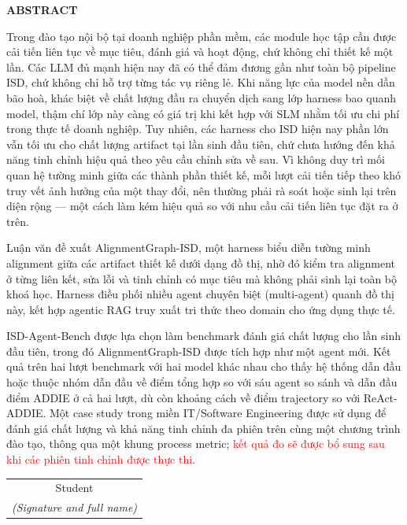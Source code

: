 \documentclass[../main.tex]{subfiles}
\begin{document}
\begin{center}
    \Large{\textbf{ABSTRACT}}\\
\end{center}
\vspace{1cm}
Trong đào tạo nội bộ tại doanh nghiệp phần mềm, các module học tập cần được cải tiến liên tục về mục tiêu, đánh giá và hoạt động, chứ không chỉ thiết kế một lần. Các \gls{LLM} đủ mạnh hiện nay đã có thể đảm đương gần như toàn bộ pipeline \gls{ISD}, chứ không chỉ hỗ trợ từng tác vụ riêng lẻ. Khi năng lực của model nền dần bão hoà, khác biệt về chất lượng đầu ra chuyển dịch sang lớp harness bao quanh model, thậm chí lớp này càng có giá trị khi kết hợp với \gls{SLM} nhằm tối ưu chi phí trong thực tế doanh nghiệp. Tuy nhiên, các harness cho ISD hiện nay phần lớn vẫn tối ưu cho chất lượng artifact tại lần sinh đầu tiên, chứ chưa hướng đến khả năng tinh chỉnh hiệu quả theo yêu cầu chỉnh sửa về sau. Vì không duy trì mối quan hệ tường minh giữa các thành phần thiết kế, mỗi lượt cải tiến tiếp theo khó truy vết ảnh hưởng của một thay đổi, nên thường phải rà soát hoặc sinh lại trên diện rộng — một cách làm kém hiệu quả so với nhu cầu cải tiến liên tục đặt ra ở trên.

Luận văn đề xuất AlignmentGraph-ISD, một harness biểu diễn tường minh alignment giữa các artifact thiết kế dưới dạng đồ thị, nhờ đó kiểm tra alignment ở từng liên kết, sửa lỗi và tinh chỉnh có mục tiêu mà không phải sinh lại toàn bộ khoá học. Harness điều phối nhiều agent chuyên biệt (multi-agent) quanh đồ thị này, kết hợp agentic RAG truy xuất tri thức theo domain cho ứng dụng thực tế.

ISD-Agent-Bench được lựa chọn làm benchmark đánh giá chất lượng cho lần sinh đầu tiên, trong đó AlignmentGraph-ISD được tích hợp như một agent mới. Kết quả trên hai lượt benchmark với hai model khác nhau cho thấy hệ thống dẫn đầu hoặc thuộc nhóm dẫn đầu về điểm tổng hợp so với sáu agent so sánh và dẫn đầu điểm ADDIE ở cả hai lượt, dù còn khoảng cách về điểm trajectory so với ReAct-ADDIE. Một case study trong miền IT/Software Engineering được sử dụng để đánh giá chất lượng và khả năng tinh chỉnh đa phiên trên cùng một chương trình đào tạo, thông qua một khung process metric; \textcolor{red}{kết quả đo sẽ được bổ sung sau khi các phiên tinh chỉnh được thực thi}.
\begin{flushright}
\begin{tabular}{@{}c@{}}
Student\\
\textit{(Signature and full name)}
\end{tabular}
\end{flushright}
\end{document}
